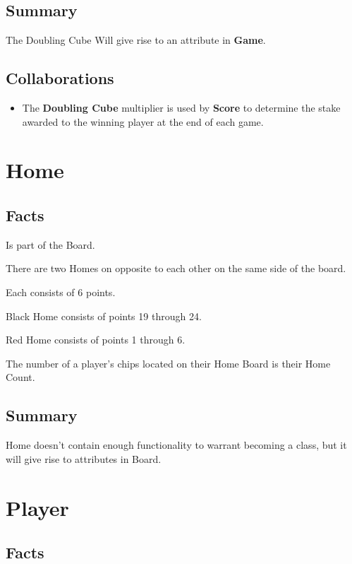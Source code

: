 \documentclass{report}
\begin{document}
\subsection{Summary}
The Doubling Cube Will give rise to an attribute in \textbf{Game}.

\subsection{Collaborations}

\begin{itemize}
    \item The \textbf{Doubling Cube} multiplier is used by \textbf{Score} to determine the stake awarded to the winning player at the end of each game.
\end{itemize}

\section{Home}

\subsection{Facts}

\begin{dashed}
    \item Is part of the Board.
    \item There are two Homes on opposite to each other on the same side of the board.
    \item Each consists of 6 points.
    \item Black Home consists of points 19 through 24.
    \item Red Home consists of points 1 through 6.
    \item The number of a player’s chips located on their Home Board is their Home Count.
\end{dashed}

\subsection{Summary}
Home doesn't contain enough functionality to warrant becoming a class, but it will give rise to attributes in Board.

\section{Player}

\subsection{Facts}
\end{document}
